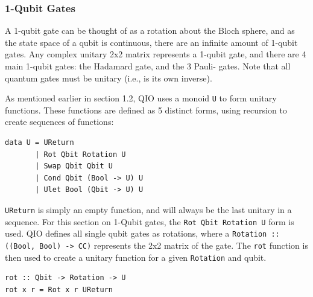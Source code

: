\documentclass[a4paper,11pt, titlepage, twoside]{article}
\begin{document}
\subsubsection{1-Qubit Gates}
A 1-qubit gate can be thought of as a rotation about the Bloch sphere, and as the state space of a qubit is continuous, there are an infinite amount of 1-qubit gates. Any complex unitary 2x2 matrix represents a 1-qubit gate, and there are 4 main 1-qubit gates: the Hadamard gate, and the 3 Pauli- gates. Note that all quantum gates must be unitary (i.e., is its own inverse).\par
As mentioned earlier in section 1.2, QIO uses a monoid \texttt{U} to form unitary functions. These functions are defined as 5 distinct forms, using recursion to create sequences of functions:
\begin{verbatim}
data U = UReturn
       | Rot Qbit Rotation U
       | Swap Qbit Qbit U
       | Cond Qbit (Bool -> U) U
       | Ulet Bool (Qbit -> U) U
\end{verbatim}
\texttt{UReturn} is simply an empty function, and will always be the last unitary in a sequence. For this section on 1-Qubit gates, the \texttt{Rot Qbit Rotation U} form is used. QIO defines all single qubit gates as rotations, where a \texttt{Rotation :: ((Bool, Bool) -> CC)} represents the 2x2 matrix of the gate. The \texttt{rot} function is then used to create a unitary function for a given \texttt{Rotation} and qubit.
\begin{verbatim}
rot :: Qbit -> Rotation -> U
rot x r = Rot x r UReturn
\end{verbatim}
\end{document}
